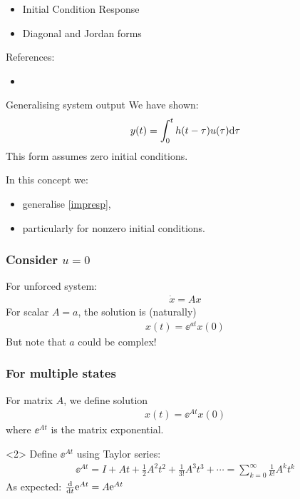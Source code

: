 \documentclass{beamer-control}
\begin{document}

\begin{SUMMARY}
\begin{itemize}
\item Initial Condition Response
\item Diagonal and Jordan forms
\end{itemize}
\vfill References:
\begin{itemize}
\item {}
\end{itemize}
\end{SUMMARY}




\begin{frame}{Generalising system output}
We have shown:
\begin{align}\label{eq:impresp}
y(t) = \int^t_0 h(t-\tau)u(\tau)\mathrm{d}\tau
\end{align}
This form assumes zero initial conditions.

In this concept we:
\begin{itemize}
\item generalise  \eqref{impresp},
\item particularly for nonzero initial conditions.
\end{itemize}
\end{frame}

\begin{frame}
\frametitle{Consider $u=0$}
For unforced system:
\begin{align}
\dot x = A x
\end{align}
For scalar $A=a$, the solution is (naturally)
\begin{align}
x(t) = \ee^{at}x(0)
\end{align}
But note that $a$ could be complex!
\end{frame}

\begin{frame}
\frametitle{For multiple states}

For matrix $A$, we define solution
\begin{align}
x(t) = \ee^{At} x(0)
\end{align}
where $\ee^{At}$ is the \alert{matrix exponential}.
\bigskip

\begin{uncoverenv}<2>
Define $\ee^{At}$ using Taylor series:
\begin{align}
\ee^{At} = I + At + \tfrac12 A^2t^2 + \tfrac{1}{3!}A^3t^3 + \cdots = \sum_{k=0}^{\infty} \tfrac{1}{k!}A^kt^k
\end{align}
As expected: $\frac{\mathrm{d} }{\mathrm{d} t} \mathrm{e}^{At} = A \mathrm{e}^{At}$
\end{uncoverenv}
\end{frame}
\end{document}
